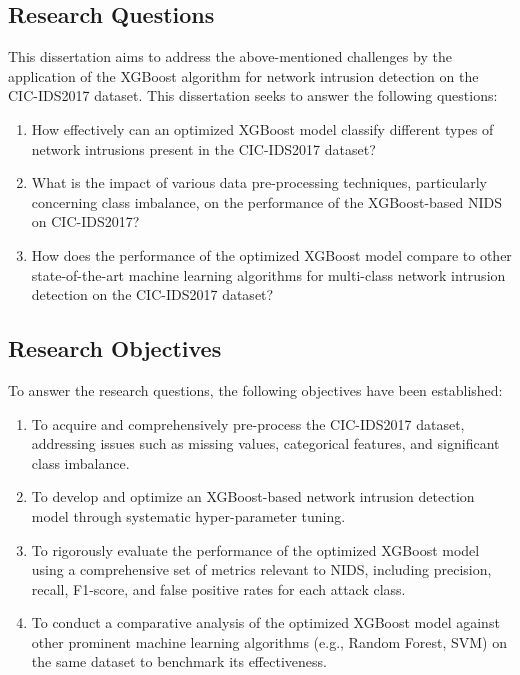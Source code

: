 \subsection{Research Questions}
This dissertation aims to address the above-mentioned challenges by the application of the XGBoost algorithm for network intrusion detection on the CIC-IDS2017 dataset. This dissertation seeks to answer the following questions:
\begin{enumerate}
	\item How effectively can an optimized XGBoost model classify different types of network intrusions present in the CIC-IDS2017 dataset?
	\item  What is the impact of various data pre-processing techniques, particularly concerning class imbalance, on the performance of the XGBoost-based NIDS on CIC-IDS2017?
	\item How does the performance of the optimized XGBoost model compare to other state-of-the-art machine learning algorithms for multi-class network intrusion detection on the CIC-IDS2017 dataset?
\end{enumerate}

\subsection{Research Objectives}
To answer the research questions, the following objectives have been established:
\begin{enumerate}
	\item To acquire and comprehensively pre-process the CIC-IDS2017 dataset, addressing issues such as missing values, categorical features, and significant class imbalance.
	\item To develop and optimize an XGBoost-based network intrusion detection model through systematic hyper-parameter tuning.
	\item To rigorously evaluate the performance of the optimized XGBoost model using a comprehensive set of metrics relevant to NIDS, including precision, recall, F1-score, and false positive rates for each attack class.
	\item To conduct a comparative analysis of the optimized XGBoost model against other prominent machine learning algorithms (e.g., Random Forest, SVM) on the same dataset to benchmark its effectiveness.
\end{enumerate}



